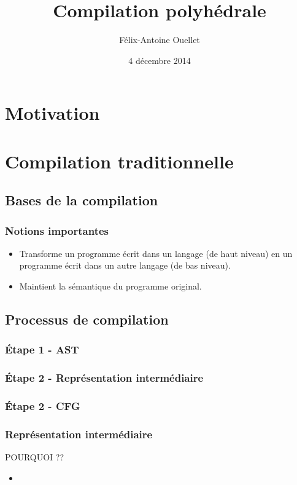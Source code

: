 \documentclass{beamer}
\author[Félix-Antoine Ouellet]{Félix-Antoine Ouellet}
\title[PolyOpt\hspace{2em}\insertframenumber/\inserttotalframenumber]{Compilation polyhédrale}
\institute{Université de Sherbrooke}
\date{4 décembre 2014}
\begin{document}
\begin{frame}
\titlepage %
\end{frame}

\begin{frame}
\tableofcontents[hideallsubsections]
\end{frame}

\section{Motivation}
\begin{frame}
\frametitle{}

\end{frame}

\section{Compilation traditionnelle}
\subsection{Bases de la compilation}
\begin{frame}
\frametitle{Notions importantes}
\begin{itemize}
\item Transforme un programme écrit dans un langage (de haut niveau) en un programme écrit dans un autre langage (de bas niveau).
\item Maintient la sémantique du programme original.
\end{itemize}
\end{frame}

\subsection{Processus de compilation}
\begin{frame}
\frametitle{Étape 1 - AST}

\end{frame}

\begin{frame}
\frametitle{Étape 2 - Représentation intermédiaire}

\end{frame}

\begin{frame}
\frametitle{Étape 2 - CFG}

\end{frame}

\begin{frame}
\frametitle{Représentation intermédiaire}
POURQUOI ??
\begin{itemize}
\item 
\end{itemize}
\end{frame}
\end{document}

